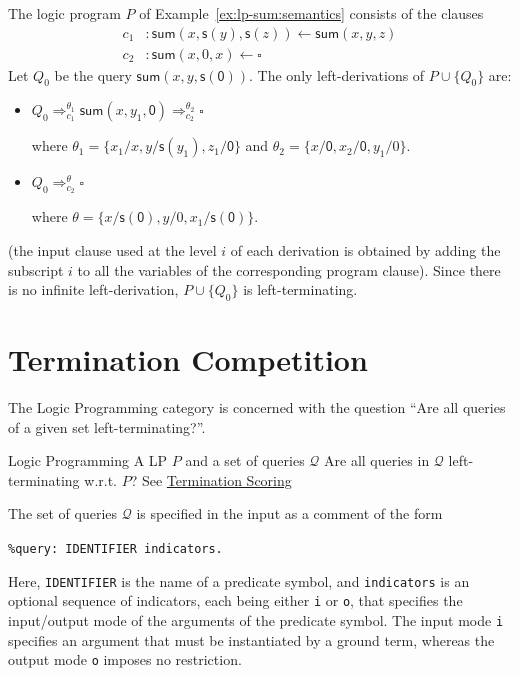 \begin{example}\label{ex:lp-sum:termination}
  The logic program $P$ of Example~\ref{ex:lp-sum:semantics}
  consists of the clauses
  \begin{align*}
    c_1 &: \mathsf{sum}(x, \mathsf{s}(y), \mathsf{s}(z)) \leftarrow \mathsf{sum}(x, y, z) \\
    c_2 &: \mathsf{sum}(x, 0, x) \leftarrow \square
  \end{align*}
  Let $Q_0$ be the query $\mathsf{sum}(x, y, \mathsf{s}(\mathsf{0}))$.
  The only left-derivations of $P \cup \{Q_0\}$ are:
  \begin{itemize}
    \item $Q_0 \Rightarrow_{c_1}^{\theta_1} \mathsf{sum}(x, y_1, \mathsf{0})
    \Rightarrow_{c_2}^{\theta_2} \square$

    where $\theta_1 = \{x_1/x, y/\mathsf{s}(y_1), z_1/\mathsf{0}\}$
    and $\theta_2 = \{x/\mathsf{0}, x_2/\mathsf{0}, y_1/0\}$.
    \item $Q_0 \Rightarrow_{c_2}^{\theta} \square$

    where $\theta = \{x/\mathsf{s}(\mathsf{0}), y/0, x_1/\mathsf{s}(\mathsf{0})\}$.
  \end{itemize}
  (the input clause used at the level $i$ of each derivation is obtained
  by adding the subscript $i$ to all the variables of the corresponding
  program clause).
  Since there is no infinite left-derivation, $P \cup \{Q_0\}$ is left-terminating.
\end{example}


\section{Termination Competition}\label{section:LP-competition}

The Logic Programming category is concerned with the question
``Are all queries of a given set left-terminating?''.

\begin{formalproblem}
  {Logic Programming}
  {A LP $P$ and a set of queries $\mathcal{Q}$}
  {Are all queries in $\mathcal{Q}$ left-terminating w.r.t. $P$?}
  {See \hyperref[scoring_termination]{Termination Scoring}}
\end{formalproblem}

The set of queries $\mathcal{Q}$ is specified in the input
as a comment of the form
\begin{center}
  \texttt{\%query: IDENTIFIER indicators.}
\end{center}
Here, \texttt{IDENTIFIER} is the name of a predicate symbol, and
\texttt{indicators} is an optional sequence %
of indicators, each being either \texttt{i} or \texttt{o}, that
specifies the input/output mode of the arguments of the predicate symbol.
The input mode \texttt{i} specifies an argument that must be instantiated
by a ground term, whereas the output mode \texttt{o} imposes no restriction.

